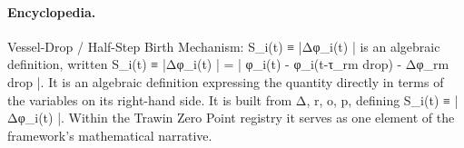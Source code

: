 \paragraph{Encyclopedia.}
Vessel-Drop / Half-Step Birth Mechanism: S\_i(t) ≡ |Δφ\_i(t) | is an algebraic definition, written S\_i(t) ≡ |Δφ\_i(t) | = | φ\_i(t) - φ\_i(t-τ\_rm drop) - Δφ\_rm drop |. It is an algebraic definition expressing the quantity directly in terms of the variables on its right-hand side. It is built from Δ, r, o, p, defining S\_i(t) ≡ |Δφ\_i(t) |. Within the Trawin Zero Point registry it serves as one element of the framework's mathematical narrative.
